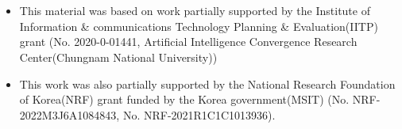 \section*{}

\begin{itemize}
    \item \scriptsize This material was based on work partially supported by the Institute of Information \& communications Technology Planning \& Evaluation(IITP) grant (No. 2020-0-01441, Artificial Intelligence Convergence Research Center(Chungnam National University))
    \item \scriptsize This work was also partially supported by the National Research Foundation of Korea(NRF) grant funded by the Korea government(MSIT) (No. NRF-2022M3J6A1084843, No. NRF-2021R1C1C1013936).
\end{itemize}


